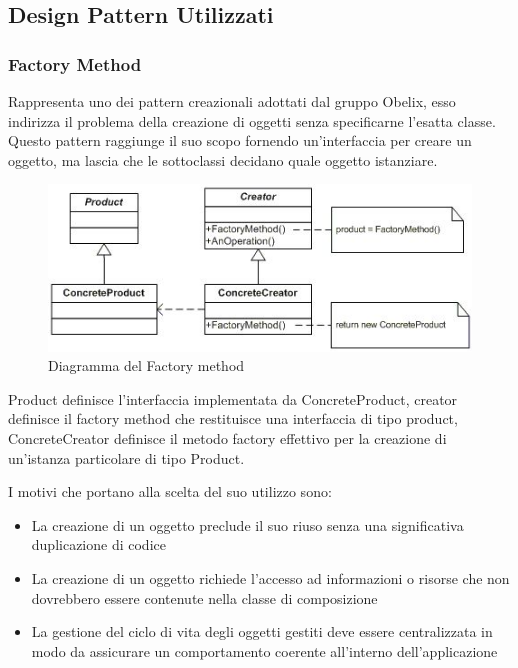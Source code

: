 \subsection{Design Pattern Utilizzati}

\subsubsection{Factory Method}
Rappresenta uno dei pattern creazionali adottati dal gruppo Obelix,
esso  indirizza il problema della creazione di oggetti senza
specificarne l'esatta classe. Questo pattern raggiunge il suo scopo
fornendo un'interfaccia per creare un oggetto, ma lascia che le
sottoclassi decidano quale oggetto istanziare. 

	\FloatBarrier
	\begin{figure}[ht]
		\centering
		\includegraphics[scale=0.45]{img/method.jpg}
		\caption{Diagramma del Factory method}
	\end{figure}


Product definisce l'interfaccia implementata da ConcreteProduct,
creator definisce il factory method che restituisce una interfaccia di
tipo product, ConcreteCreator definisce il metodo factory effettivo
per la creazione di un’istanza particolare di tipo Product. 

I motivi che portano alla scelta del suo utilizzo sono:

\begin{itemize}
\item La creazione di un oggetto preclude il suo riuso senza una significativa duplicazione di codice
\item  La creazione di un oggetto richiede l'accesso ad informazioni o risorse che non dovrebbero essere contenute nella classe di composizione
\item La gestione del ciclo di vita degli oggetti gestiti deve essere centralizzata in modo da assicurare un comportamento coerente all'interno dell'applicazione

\end{itemize}


